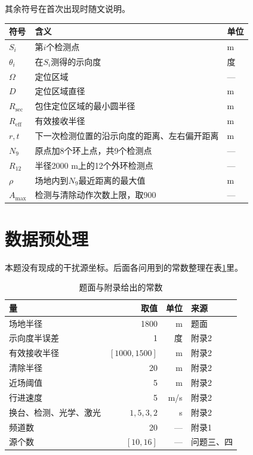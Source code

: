 \documentclass{cumcmthesis}
\begin{document}
其余符号在首次出现时随文说明。

\begin{center}
\begin{tabular}{lll}
\toprule
符号 & 含义 & 单位 \\
\midrule
$S_i$ & 第$i$个检测点 & m \\
$\theta_i$ & 在$S_i$测得的示向度 & 度 \\
$\Omega$ & 定位区域 & --- \\
$D$ & 定位区域直径 & m \\
$R_{\mathrm{sec}}$ & 包住定位区域的最小圆半径 & m \\
$R_{\mathrm{eff}}$ & 有效接收半径 & m \\
$r,t$ & 下一次检测位置的沿示向度的距离、左右偏开距离 & m \\
$N_9$ & 原点加8个环上点，共9个检测点 & --- \\
$R_{12}$ & 半径2000 m上的12个外环检测点 & --- \\
$\rho$ & 场地内到$N_9$最近距离的最大值 & m \\
$A_{\max}$ & 检测与清除动作次数上限，取900 & --- \\
\bottomrule
\end{tabular}
\end{center}

\section{数据预处理}

本题没有现成的干扰源坐标。后面各问用到的常数整理在表\ref{tab:protocol}里。

\begin{table}[!ht]
\centering
\caption{题面与附录给出的常数}
\label{tab:protocol}
\begin{tabular}{lrrl}
\toprule
量 & 取值 & 单位 & 来源 \\
\midrule
场地半径 & 1800 & m & 题面 \\
示向度半误差 & 1 & 度 & 附录2 \\
有效接收半径 & $[1000,1500]$ & m & 附录2 \\
清除半径 & 20 & m & 附录2 \\
近场阈值 & 5 & m & 附录2 \\
行进速度 & 5 & m/s & 附录2 \\
换台、检测、光学、激光 & $1,5,3,2$ & s & 附录2 \\
频道数 & 20 & --- & 附录1 \\
源个数 & $[10,16]$ & --- & 问题三、四 \\
\bottomrule
\end{tabular}
\end{table}
\end{document}
